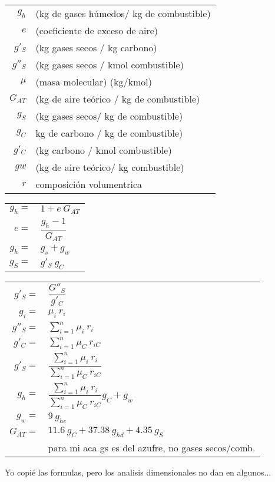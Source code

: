 \documentclass[11pt,a4paper]{article}
\begin{document}
	\begin{cajita}
		\begin{multicols}{2}
			\begin{tabular}{r p{}}
				$g_{h}$ & (kg de gases húmedos/ kg de combustible)\\
				$e$ & (coeficiente de exceso de aire)\\
				$g'_{S}$ & (kg gases secos / kg carbono)\\
				$g''_{S}$ & (kg gases secos / kmol combustible)\\
				$\mu$ & (masa molecular) (kg/kmol)\\
				$G_{AT}$ & (kg de aire teórico / kg de combustible)\\
				$g_{S}$ & (kg gases secos/ kg de combustible)\\
				$g_{C}$ & kg de carbono / kg de combustible)\\
				$g'_{C}$ & (kg carbono / kmol combustible)\\
				$g{w}$ & (kg de aire teórico/ kg combustible)\\
				$r$ & composición volumentrica\\
				
			\end{tabular}
			\begin{tabular}{r l }
			$g_{h}=$&$1+e~G_{AT}$\\[0.2cm]
			$e=$&$\dfrac{g_{h}-1}{G_{AT}}$\\
			$g_{h}=$&$g_{s}+g_{w}$\\
			$g_{S}=$&$g'_{S}~g_{C}$\\
			\end{tabular}
			\begin{tabular}{r l }
				$g'_{S}=$&$\dfrac{G''_{S}}{g'_{C}}$\\
				$g_{i}=$&$\mu_{i}~r_{i}$\\[0.3cm]
				$g''_{S}=$&$\displaystyle \sum_{i=1}^{n} \mu_{i}~r_{i}$\\[0.3cm]
				$g'_{C}=$&$\displaystyle \sum_{i=1}^{n} \mu_{C}~r_{iC}$\\[0.3cm]
				$g'_{S}=$&$\dfrac{\sum_{i=1}^{n} \mu_{i}~r_{i}}{\sum_{i=1}^{n} \mu_{C}~r_{iC}}$\\[0.3cm]
				$g_{h}=$&$\dfrac{\sum_{i=1}^{n} \mu_{i}~r_{i}}{\sum_{i=1}^{n} \mu_{C}~r_{iC}} g_{C}+g_{w}$\\[0.35cm]
				$g_{w}=$&$9~g_{he}$\\[0.1cm]
				$G_{AT}=$&$11.6~g_{C}+37.38~g_{hd}+4.35~g_{S}$\\
				&\tiny{para mi aca gs es del azufre, no gases secos/comb.}
			\end{tabular}
		\end{multicols}
	Yo copié las formulas, pero los analisis dimensionales no dan en algunos...
	\end{cajita}
		
\end{document}
